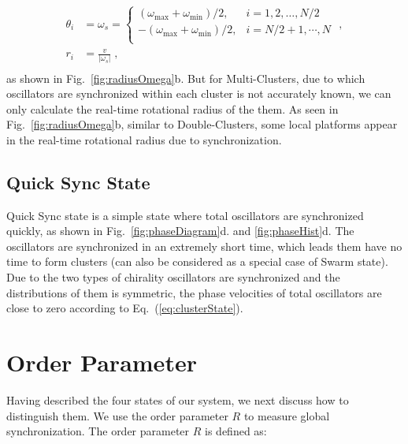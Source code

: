 \documentclass[%
 aip,
 amsmath,amssymb,
 reprint,%
]{revtex4-1}
\begin{document}
\begin{equation}
    \begin{aligned}\label{eq:clusterState2}
        \theta _i&=\omega _s=\begin{cases}
        \left( \omega _{\max}+\omega _{\min} \right) /2,&		i=1,2,\dots ,N/2\\
        -\left( \omega _{\max}+\omega _{\min} \right) /2,&		i=N/2+1,\cdots ,N\\
    \end{cases}\,\,,\\
        r_i&=\frac{v}{\left|\omega _s\right|}\;,\\
    \end{aligned}
\end{equation}
as shown in Fig.~\ref{fig:radiusOmega}b. But for Multi-Clusters, due to which oscillators are synchronized within each cluster is not accurately known, we can only calculate the real-time rotational radius of the them. As seen in Fig.~\ref{fig:radiusOmega}b, similar to Double-Clusters, some local platforms appear in the real-time rotational radius due to synchronization.

\subsection{Quick Sync State}

Quick Sync state is a simple state where total oscillators are synchronized quickly, as shown in Fig.~\ref{fig:phaseDiagram}d. and \ref{fig:phaseHist}d. The oscillators are synchronized in an extremely short time, which leads them have no time to form clusters (can also be considered as a special case of Swarm state). Due to the two types of chirality oscillators are synchronized and the distributions of them is symmetric, the phase velocities of total oscillators are close to zero according to Eq.~(\ref{eq:clusterState}).

\section{\label{sec:orderParam}Order Parameter}

Having described the four states of our system, we next discuss how to distinguish them. We use the order parameter $R$ to measure global synchronization. The order parameter $R$ is defined as:
\end{document}
